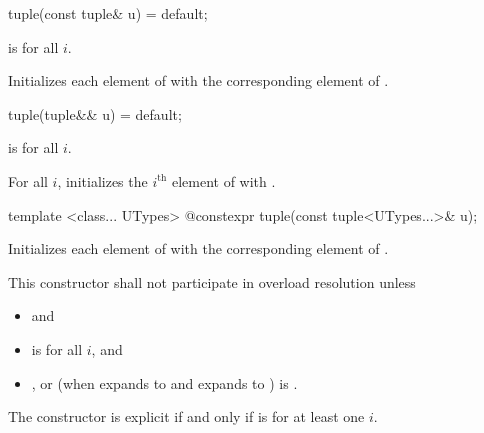 %
\begin{itemdecl}
tuple(const tuple& u) = default;
\end{itemdecl}

\begin{itemdescr}
\pnum
\requires {} is  for all $i$.

\pnum
\effects Initializes each element of  with the
corresponding element of .
\end{itemdescr}

%
\begin{itemdecl}
tuple(tuple&& u) = default;
\end{itemdecl}

\begin{itemdescr}
\pnum
\requires {} is  for all $i$.

\pnum
\effects For all $i$, initializes the $i^\text{th}$ element of  with
.
\end{itemdescr}

%
\begin{itemdecl}
template <class... UTypes> @\EXPLICIT@ constexpr tuple(const tuple<UTypes...>& u);
\end{itemdecl}

\begin{itemdescr}
\pnum
\effects Initializes each element of 
with the corresponding element of .

\pnum
\remarks This constructor shall not participate in overload resolution unless
\begin{itemize}
\item
{} \tcode{==}  and
\item
{} is  for all $i$, and
\item
{}, or
(when  expands to  and  expands to )\linebreak
{}
is .
\end{itemize}
The constructor is explicit if and only if
 is 
for at least one $i$.
\end{itemdescr}

